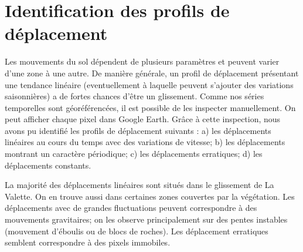 \documentclass[11pt, openany]{report}
\begin{document}
\section{Identification des profils de déplacement}
Les mouvements du sol dépendent de plusieurs paramètres et peuvent varier d'une zone à une autre. De manière générale, un profil de déplacement présentant une tendance linéaire (eventuellement à laquelle peuvent s'ajouter des variations saisonnières) a de fortes chances d'être un glissement. Comme nos séries temporelles sont géoréférencées, il est possible de les inspecter manuellement. On peut afficher chaque pixel dans Google Earth. Grâce à cette inspection, nous avons pu identifié les profils de déplacement suivants : a) les déplacements linéaires au cours du temps avec des variations de vitesse; b) les déplacements montrant un caractère périodique; c) les déplacements erratiques; d) les déplacements constants.

La majorité des déplacements linéaires sont situés dans le glissement de La Valette. On en trouve aussi dans certaines zones couvertes par la végétation. Les déplacements avec de grandes fluctuations peuvent correspondre à des mouvements gravitaires; on les observe principalement sur des pentes instables (mouvement d'éboulis ou de blocs de roches). Les déplacement erratiques semblent correspondre à des pixels immobiles.
\end{document}
